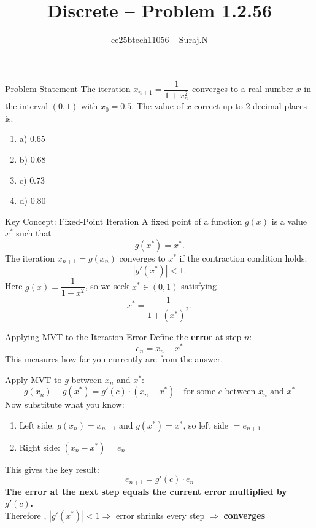 \documentclass{beamer}
\title{Discrete -- Problem 1.2.56}
\author{ee25btech11056 -- Suraj.N}
\providecommand{\abs}[1]{\left\vert#1\right\vert}
\begin{document}
\begin{frame}
  \titlepage
\end{frame}
\begin{frame}{Problem Statement}
The iteration $x_{n+1} = \dfrac{1}{1 + x_n^2}$ converges to a real number $x$ in the
interval $(0,1)$ with $x_0 = 0.5$. The value of $x$ correct up to 2 decimal places is:

\begin{enumerate}
\item a) $0.65$
\item b) $0.68$
\item c) $0.73$
\item d) $0.80$
\end{enumerate}
\end{frame}
\begin{frame}{Key Concept: Fixed-Point Iteration}
A fixed point of a function $g(x)$ is a value $x^*$ such that
\[
  g(x^*) = x^*.
\]
The iteration $x_{n+1} = g(x_n)$ converges to $x^*$ if the contraction condition holds:
\[
  \abs{g'(x^*)} < 1.
\]
Here $g(x) = \dfrac{1}{1+x^2}$, so we seek $x^* \in (0,1)$ satisfying
\[
  x^* = \frac{1}{1+(x^*)^2}.
\]
\end{frame}

\begin{frame}{Applying MVT to the Iteration Error}
Define the \textbf{error} at step $n$:
\[
  e_n = x_n - x^*
\]
This measures how far you currently are from the answer.

Apply MVT to $g$ between $x_n$ and $x^*$:
\[
  g(x_n) - g(x^*) = g'(c)\cdot(x_n - x^*) \quad \text{for some } c
  \text{ between } x_n \text{ and } x^*
\]
Now substitute what you know:
\begin{enumerate}
\item Left side: $g(x_n) = x_{n+1}$ and $g(x^*) = x^*$, so left side $= e_{n+1}$
\item Right side: $(x_n - x^*) = e_n$
\end{enumerate}
This gives the key result:
\[
\boxed{e_{n+1} = g'(c)\cdot e_n}
\]
\textbf{The error at the next step equals the current error multiplied by $g'(c)$.}\\ 
Therefore , $\abs{g'(x^*)} < 1 \Rightarrow$ error shrinks every step $\Rightarrow$ \textbf{converges}
\end{frame}
\end{document}
